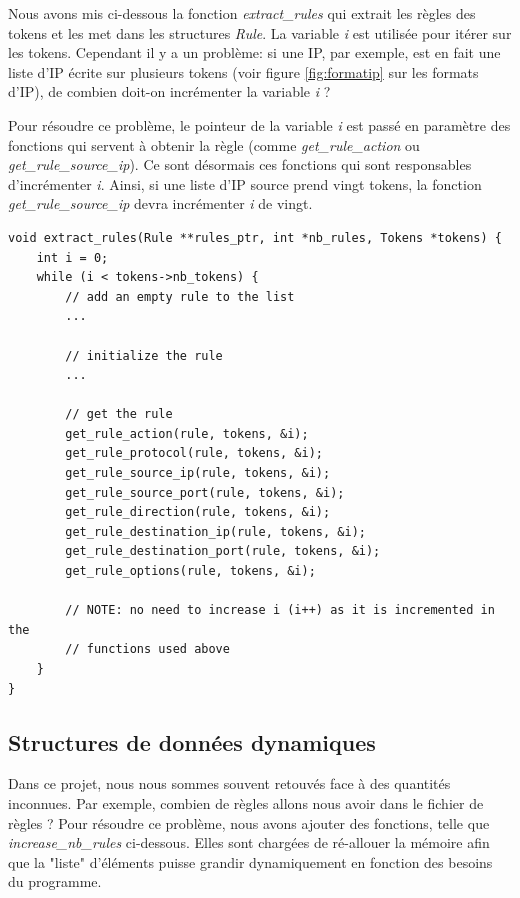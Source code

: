 \documentclass[a4paper]{article}
\begin{document}
Nous avons mis ci-dessous la fonction \textit{extract\_rules} qui extrait les règles des tokens et les met dans les structures \textit{Rule}. La variable \textit{i} est utilisée pour itérer sur les tokens. Cependant il y a un problème: si une IP, par exemple, est en fait une liste d'IP écrite sur plusieurs tokens (voir figure \ref{fig:formatip} sur les formats d'IP), de combien doit-on incrémenter la variable \textit{i} ?

Pour résoudre ce problème, le pointeur de la variable \textit{i} est passé en paramètre des fonctions qui servent à obtenir la règle (comme \textit{get\_rule\_action} ou \textit{get\_rule\_source\_ip}). Ce sont désormais ces fonctions qui sont responsables d'incrémenter \textit{i}. Ainsi, si une liste d'IP source prend vingt tokens, la fonction \textit{get\_rule\_source\_ip} devra incrémenter \textit{i} de vingt.
\begin{lstlisting}[style=CStyle]
void extract_rules(Rule **rules_ptr, int *nb_rules, Tokens *tokens) {
    int i = 0;
    while (i < tokens->nb_tokens) {
        // add an empty rule to the list
        ...

        // initialize the rule
        ...

        // get the rule
        get_rule_action(rule, tokens, &i);
        get_rule_protocol(rule, tokens, &i);
        get_rule_source_ip(rule, tokens, &i);
        get_rule_source_port(rule, tokens, &i);
        get_rule_direction(rule, tokens, &i);
        get_rule_destination_ip(rule, tokens, &i);
        get_rule_destination_port(rule, tokens, &i);
        get_rule_options(rule, tokens, &i);

        // NOTE: no need to increase i (i++) as it is incremented in the
        // functions used above
    }
}
\end{lstlisting}





\subsection{Structures de données dynamiques}



Dans ce projet, nous nous sommes souvent retouvés face à des quantités inconnues. Par exemple, combien de règles allons nous avoir dans le fichier de règles ? Pour résoudre ce problème, nous avons ajouter des fonctions, telle que \textit{increase\_nb\_rules} ci-dessous. Elles sont chargées de ré-allouer la mémoire afin que la "liste" d'éléments puisse grandir dynamiquement en fonction des besoins du programme.
\end{document}
